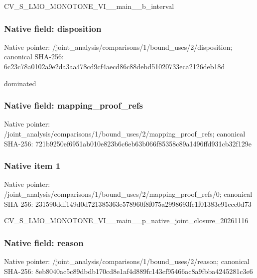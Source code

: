 \documentclass[10pt,a4paper]{article}
\begin{document}
\begingroup\raggedright\sloppy CV\_\allowbreak{}S\_\allowbreak{}LMO\_\allowbreak{}MONOTONE\_\allowbreak{}VI\_\allowbreak{}\_\allowbreak{}main\_\allowbreak{}\_\allowbreak{}b\_\allowbreak{}interval\par\endgroup

\subsubsection{Native field: disposition}
Native pointer: /joint\_\allowbreak{}analysis/comparisons/1/bound\_\allowbreak{}uses/2/disposition; canonical SHA-256: 6c23c78a0102a9e2da3aa478cd9cf4aecd86c88debd51020733eca2126deb18d

\begingroup\raggedright\sloppy dominated\par\endgroup

\subsubsection{Native field: mapping\_\allowbreak{}proof\_\allowbreak{}refs}
Native pointer: /joint\_\allowbreak{}analysis/comparisons/1/bound\_\allowbreak{}uses/2/mapping\_\allowbreak{}proof\_\allowbreak{}refs; canonical SHA-256: 721b9250ef6951ab010e823b6c6eb63b066f85358c89a1496ffd931cb32f129e

\subsubsection{Native item 1}
Native pointer: /joint\_\allowbreak{}analysis/comparisons/1/bound\_\allowbreak{}uses/2/mapping\_\allowbreak{}proof\_\allowbreak{}refs/0; canonical SHA-256: 231590ddf149d0d721385363e578960f8f075a2998693fc1f01383c91cce0d73

\begingroup\raggedright\sloppy CV\_\allowbreak{}S\_\allowbreak{}LMO\_\allowbreak{}MONOTONE\_\allowbreak{}VI\_\allowbreak{}\_\allowbreak{}main\_\allowbreak{}\_\allowbreak{}p\_\allowbreak{}native\_\allowbreak{}joint\_\allowbreak{}closure\_\allowbreak{}20261116\par\endgroup

\subsubsection{Native field: reason}
Native pointer: /joint\_\allowbreak{}analysis/comparisons/1/bound\_\allowbreak{}uses/2/reason; canonical SHA-256: 8eb8040ac5c89dbdb170cd8e1af4d889fc143cf95466ac8a9fbba4245281c3e6
\end{document}
